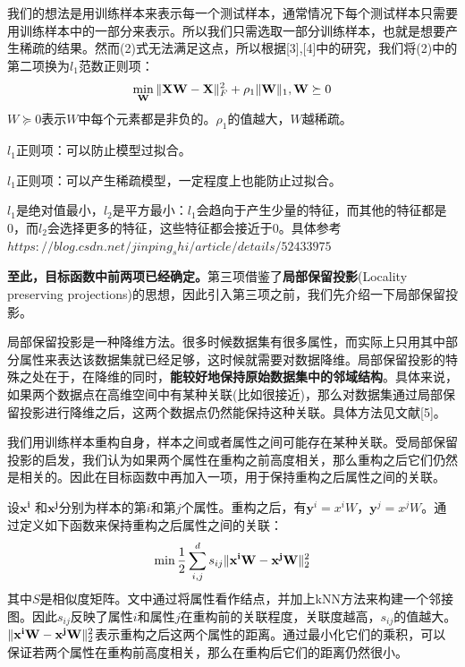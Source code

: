 \documentclass{ctexart}
\begin{document}
	我们的想法是用训练样本来表示每一个测试样本，通常情况下每个测试样本只需要用训练样本中的一部分来表示。所以我们只需选取一部分训练样本，也就是想要产生稀疏的结果。然而(2)式无法满足这点，所以根据[3],[4]中的研究，我们将(2)中的第二项换为$ l_1 $范数正则项：
	\begin{equation}
	\min_\mathbf{W} \Arrowvert{\mathbf{XW-X}}\Arrowvert_{F}^{2} + \rho_1 \Arrowvert{\mathbf W}\Arrowvert_1,\mathbf W \succeq 0
	\end{equation}
	$ W \succeq 0 $表示$ W $中每个元素都是非负的。$ \rho_1 $的值越大，$ W $越稀疏。
	
	$ l_1 $正则项：可以防止模型过拟合。
	
	$ l_1 $正则项：可以产生稀疏模型，一定程度上也能防止过拟合。
	
	$ l_1 $是绝对值最小，$ l_2 $是平方最小：$ l_1 $会趋向于产生少量的特征，而其他的特征都是0，而$ l_2 $会选择更多的特征，这些特征都会接近于0。具体参考$ https://blog.csdn.net/jinping_shi/article/details/52433975 $
	
	{\bfseries 至此，目标函数中前两项已经确定。}第三项借鉴了{\bfseries 局部保留投影}(Locality preserving projections)的思想，因此引入第三项之前，我们先介绍一下局部保留投影。
	
	局部保留投影是一种降维方法。很多时候数据集有很多属性，而实际上只用其中部分属性来表达该数据集就已经足够，这时候就需要对数据降维。局部保留投影的特殊之处在于，在降维的同时，{\bfseries 能较好地保持原始数据集中的邻域结构}。具体来说，如果两个数据点在高维空间中有某种关联(比如很接近)，那么对数据集通过局部保留投影进行降维之后，这两个数据点仍然能保持这种关联。具体方法见文献[5]。
	
	我们用训练样本重构自身，样本之间或者属性之间可能存在某种关联。受局部保留投影的启发，我们认为如果两个属性在重构之前高度相关，那么重构之后它们仍然是相关的。因此在目标函数中再加入一项，用于保持重构之后属性之间的关联。
	
	设$ \mathbf{x^i} $ 和$ \mathbf{x^j} $分别为样本的第$ i $和第$ j $个属性。重构之后，有$ \mathbf y^{i} = x^{i}W $，$ \mathbf y^{j} = x^{j}W $。通过定义如下函数来保持重构之后属性之间的关联：
	\begin{equation}
	\min \frac{1}{2}\sum_{i,j}^{d}s_{ij}\Arrowvert{\mathbf{x^iW-x^jW}}\Arrowvert_2^2 \notag
	\end{equation}
	其中$ S $是相似度矩阵。文中通过将属性看作结点，并加上kNN方法来构建一个邻接图。因此$ s_{ij} $反映了属性$ i $和属性$ j $在重构前的关联程度，关联度越高，$ s_{ij} $的值越大。$\Arrowvert{\mathbf{x^iW-x^jW}}\Arrowvert_2^2 $表示重构之后这两个属性的距离。通过最小化它们的乘积，可以保证若两个属性在重构前高度相关，那么在重构后它们的距离仍然很小。
	
\end{document}
